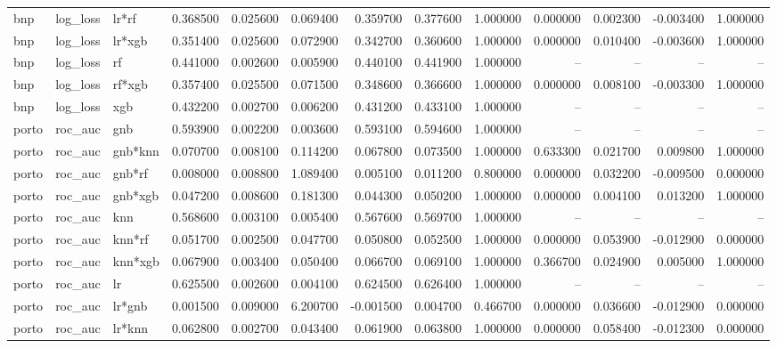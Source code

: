 \begin{landscape}
\begin{longtable}{lllrrrrrrrrrr}
bnp & log\_loss & lr*rf & 0.368500 & 0.025600 & 0.069400 & 0.359700 & 0.377600 & 1.000000 & 0.000000 & 0.002300 & -0.003400 & 1.000000 \\
bnp & log\_loss & lr*xgb & 0.351400 & 0.025600 & 0.072900 & 0.342700 & 0.360600 & 1.000000 & 0.000000 & 0.010400 & -0.003600 & 1.000000 \\
bnp & log\_loss & rf & 0.441000 & 0.002600 & 0.005900 & 0.440100 & 0.441900 & 1.000000 & -- & -- & -- & -- \\
bnp & log\_loss & rf*xgb & 0.357400 & 0.025500 & 0.071500 & 0.348600 & 0.366600 & 1.000000 & 0.000000 & 0.008100 & -0.003300 & 1.000000 \\
bnp & log\_loss & xgb & 0.432200 & 0.002700 & 0.006200 & 0.431200 & 0.433100 & 1.000000 & -- & -- & -- & -- \\
porto & roc\_auc & gnb & 0.593900 & 0.002200 & 0.003600 & 0.593100 & 0.594600 & 1.000000 & -- & -- & -- & -- \\
porto & roc\_auc & gnb*knn & 0.070700 & 0.008100 & 0.114200 & 0.067800 & 0.073500 & 1.000000 & 0.633300 & 0.021700 & 0.009800 & 1.000000 \\
porto & roc\_auc & gnb*rf & 0.008000 & 0.008800 & 1.089400 & 0.005100 & 0.011200 & 0.800000 & 0.000000 & 0.032200 & -0.009500 & 0.000000 \\
porto & roc\_auc & gnb*xgb & 0.047200 & 0.008600 & 0.181300 & 0.044300 & 0.050200 & 1.000000 & 0.000000 & 0.004100 & 0.013200 & 1.000000 \\
porto & roc\_auc & knn & 0.568600 & 0.003100 & 0.005400 & 0.567600 & 0.569700 & 1.000000 & -- & -- & -- & -- \\
porto & roc\_auc & knn*rf & 0.051700 & 0.002500 & 0.047700 & 0.050800 & 0.052500 & 1.000000 & 0.000000 & 0.053900 & -0.012900 & 0.000000 \\
porto & roc\_auc & knn*xgb & 0.067900 & 0.003400 & 0.050400 & 0.066700 & 0.069100 & 1.000000 & 0.366700 & 0.024900 & 0.005000 & 1.000000 \\
porto & roc\_auc & lr & 0.625500 & 0.002600 & 0.004100 & 0.624500 & 0.626400 & 1.000000 & -- & -- & -- & -- \\
porto & roc\_auc & lr*gnb & 0.001500 & 0.009000 & 6.200700 & -0.001500 & 0.004700 & 0.466700 & 0.000000 & 0.036600 & -0.012900 & 0.000000 \\
porto & roc\_auc & lr*knn & 0.062800 & 0.002700 & 0.043400 & 0.061900 & 0.063800 & 1.000000 & 0.000000 & 0.058400 & -0.012300 & 0.000000 \\
\end{longtable}\endgroup\addtocounter{table}{-1}

\end{landscape}
